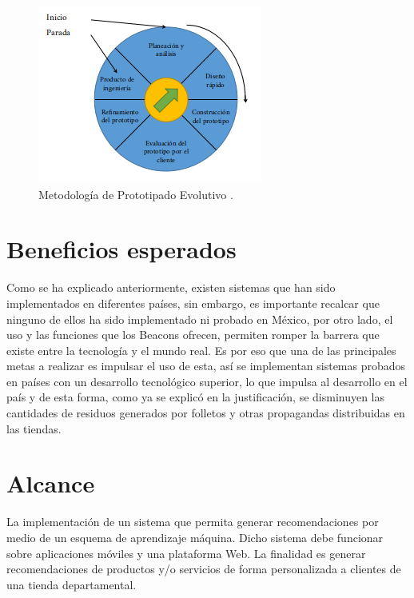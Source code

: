 \FloatBarrier
\begin{figure}[htbp!]
		\centering
			\includegraphics[width=.45 \textwidth]{imagenes/PE}
		\caption{Metodología de Prototipado Evolutivo \cite{Zachman}. }
		\label{image:metodologiaprototipado}
\end{figure}
\FloatBarrier

\section{Beneficios esperados}
Como se ha explicado anteriormente, existen sistemas que han sido implementados en diferentes países, sin embargo, es importante recalcar que ninguno de ellos ha sido implementado ni probado en México, por otro lado, el uso y las funciones que los Beacons ofrecen, permiten romper la barrera que existe entre la tecnología y el mundo real. Es por eso que una de las principales metas a realizar es impulsar el uso de esta, así se implementan sistemas probados en países con un desarrollo tecnológico superior, lo que impulsa al desarrollo en el país y de esta forma, como ya se explicó en la justificación, se disminuyen las cantidades de residuos generados por folletos y otras propagandas distribuidas en las tiendas.
\\ \par
\section{Alcance}
La implementación de un sistema que permita generar recomendaciones por medio de un esquema de aprendizaje máquina. Dicho sistema debe funcionar sobre aplicaciones móviles y una plataforma Web. La finalidad es generar recomendaciones de productos y/o servicios de forma personalizada a clientes de una tienda departamental.
\\ \par
\newpage
